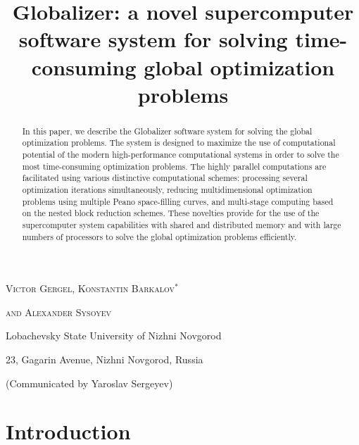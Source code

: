 \documentclass{naco}
\title[Globalizer: a supercomputer software] %
      {Globalizer: a novel supercomputer software system for solving time-consuming global optimization problems}
\author[V. P. Gergel, K. A. Barkalov and A. V. Sysoyev]{}
\theoremstyle{definition}
\begin{document}
\maketitle


\centerline{\scshape Victor Gergel, Konstantin  Barkalov$^*$  }
\centerline{\scshape and Alexander Sysoyev}
\medskip
{\footnotesize
 \centerline{Lobachevsky State University of Nizhni Novgorod}
   \centerline{23, Gagarin Avenue, Nizhni Novgorod, Russia}
}

\bigskip

 \centerline{(Communicated by Yaroslav Sergeyev)}


\begin{abstract}
In this paper, we describe the Globalizer software system for solving the global
optimization problems. The system is designed to maximize the use of computational
potential of the modern high-performance computational systems in order to solve the
most time-consuming optimization problems. The highly parallel computations are facilitated
using various distinctive computational schemes: processing several optimization
iterations simultaneously, reducing multidimensional optimization problems using multiple
Peano space-filling curves, and multi-stage computing based on the nested block reduction schemes.
These novelties provide for the use of the supercomputer system capabilities with shared
and distributed memory and with large numbers of processors to solve the global
optimization problems efficiently.
\end{abstract}

\section{Introduction}\label{sec:intro}
\end{document}
